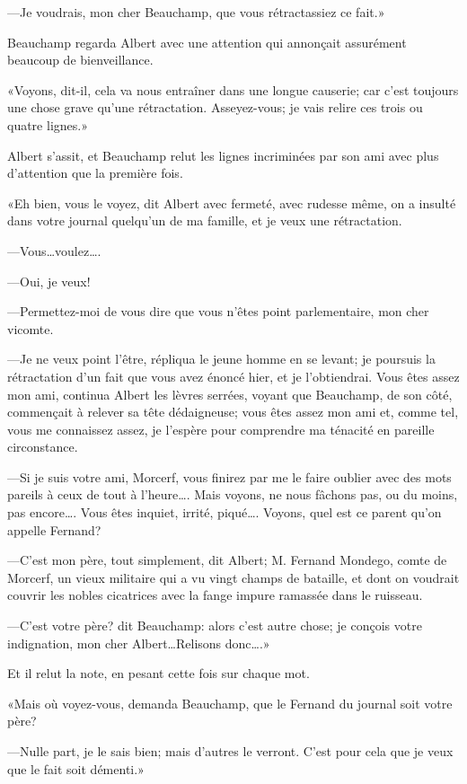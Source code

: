 —Je voudrais, mon cher Beauchamp, que vous rétractassiez ce fait.» 

Beauchamp regarda Albert avec une attention qui annonçait assurément beaucoup de bienveillance. 

«Voyons, dit-il, cela va nous entraîner dans une longue causerie; car c'est toujours une chose grave qu'une rétractation. Asseyez-vous; je vais relire ces trois ou quatre lignes.» 

Albert s'assit, et Beauchamp relut les lignes incriminées par son ami avec plus d'attention que la première fois. 

«Eh bien, vous le voyez, dit Albert avec fermeté, avec rudesse même, on a insulté dans votre journal quelqu'un de ma famille, et je veux une rétractation. 

—Vous\dots voulez\dots. 

—Oui, je veux! 

—Permettez-moi de vous dire que vous n'êtes point parlementaire, mon cher vicomte. 

—Je ne veux point l'être, répliqua le jeune homme en se levant; je poursuis la rétractation d'un fait que vous avez énoncé hier, et je l'obtiendrai. Vous êtes assez mon ami, continua Albert les lèvres serrées, voyant que Beauchamp, de son côté, commençait à relever sa tête dédaigneuse; vous êtes assez mon ami et, comme tel, vous me connaissez assez, je l'espère pour comprendre ma ténacité en pareille circonstance. 

—Si je suis votre ami, Morcerf, vous finirez par me le faire oublier avec des mots pareils à ceux de tout à l'heure\dots. Mais voyons, ne nous fâchons pas, ou du moins, pas encore\dots. Vous êtes inquiet, irrité, piqué\dots. Voyons, quel est ce parent qu'on appelle Fernand? 

—C'est mon père, tout simplement, dit Albert; M. Fernand Mondego, comte de Morcerf, un vieux militaire qui a vu vingt champs de bataille, et dont on voudrait couvrir les nobles cicatrices avec la fange impure ramassée dans le ruisseau. 

—C'est votre père? dit Beauchamp: alors c'est autre chose; je conçois votre indignation, mon cher Albert\dots Relisons donc\dots.» 

Et il relut la note, en pesant cette fois sur chaque mot. 

«Mais où voyez-vous, demanda Beauchamp, que le Fernand du journal soit votre père? 

—Nulle part, je le sais bien; mais d'autres le verront. C'est pour cela que je veux que le fait soit démenti.» 

